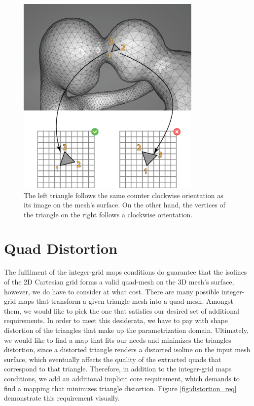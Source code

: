 \begin{figure}[ht]
\centering
\includegraphics[width=9cm]{figures/orientation/orientation.png}
\caption[The Orientation Requirement]{The left triangle follows the same counter clockwise orientation as its image on the mesh's surface. On the other hand, the vertices of the triangle on the right follows a clockwise orientation.}
\label{fig:orientation_req}
\end{figure}

\section{Quad Distortion}
\label{label:quad_distortion_cond}
The fulfilment of the integer-grid maps conditions do guarantee that the isolines of the 2D Cartesian grid forms a valid quad-mesh on the 3D mesh's surface, however, we do have to consider at what cost. There are many possible integer-grid maps that transform a given triangle-mesh into a quad-mesh. Amongst them, we would like to pick the one that satisfies our desired set of additional requirements. In order to meet this desiderata, we have to pay with shape distortion of the triangles that make up the parametrization domain. Ultimately, we would like to find a map that fits our needs and minimizes the triangles distortion, since a distorted triangle renders a distorted isoline on the input mesh surface, which eventually affects the quality of the extracted quads that correspond to that triangle. Therefore, in addition to the integer-grid maps conditions, we add an additional implicit core requirement, which demands to find a mapping that minimizes triangle distortion. Figure \ref{fig:distortion_req} demonstrate this requirement visually.

